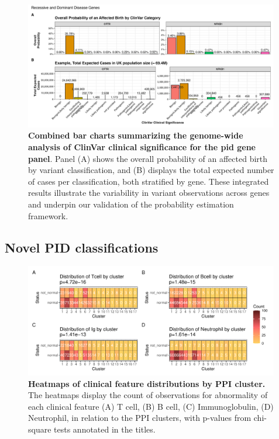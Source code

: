 \begin{figure}[ht]
  \centering
  \includegraphics[width=0.99\textwidth]{../images/all_genes_combined_bar_charts_mini.png}
  \caption{\textbf{Combined bar charts summarizing the genome-wide analysis of ClinVar clinical significance for the \ac{pid} gene panel}. Panel (A) shows the overall probability of an affected birth by variant classification, and (B) displays the total expected number of cases per classification, both stratified by gene. These integrated results illustrate the variability in variant observations across genes and underpin our validation of the probability estimation framework.}
  \label{fig:all_genes_combined_bar_charts_mini}
\end{figure}


\FloatBarrier
\subsection{Novel PID classifications}



\begin{figure}[ht]
  \centering
  \includegraphics[width=0.99\textwidth]{../images/plot_multicat_patch_3_clust_chi.pdf}
  \caption{\textbf{Heatmaps of clinical feature distributions by PPI cluster.} The heatmaps display the count of observations for abnormality of each clinical feature (A) T cell, (B) B cell, (C) Immunoglobulin, (D) Neutrophil, in relation to the PPI clusters, with p-values from chi-square tests annotated in the titles.}
  \label{fig:plot_multicat_patch_3_clust_chi}
\end{figure}

